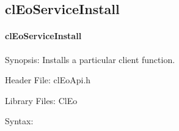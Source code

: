 \begin{flushleft}
  \newpage
\subsection{clEoServiceInstall}
\hypertarget{pageeo110}{}\paragraph{cl\-Eo\-Service\-Install}\label{pageeo110}
\begin{Desc}
\item[Synopsis:]Installs a particular client function.\end{Desc}
\begin{Desc}
\item[Header File:]clEoApi.h\end{Desc}
\begin{Desc}
\item[Library Files:]Cl\-Eo\end{Desc}
\begin{Desc}
\item[Syntax:]


\end{Desc}
\end{flushleft}
